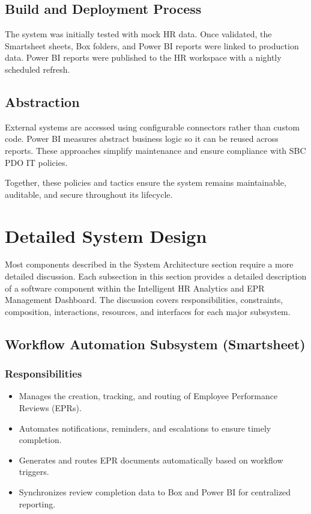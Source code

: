 \documentclass[12pt]{article}
\def\textit#1{#1}%
\def\&{ and }%
\begin{document}
\subsection{Build and Deployment Process}
The system was initially tested with mock HR data. Once validated, the Smartsheet sheets, Box folders, and Power BI reports were linked to production data. Power BI
reports were published to the HR workspace with a nightly scheduled refresh.

\subsection{Abstraction}
External systems are accessed using configurable connectors rather than custom code. Power BI
measures abstract business logic so it can be reused across reports. These approaches simplify
maintenance and ensure compliance with SBC PDO IT policies.

\noindent\textit{Together, these policies and tactics ensure the system remains maintainable,
auditable, and secure throughout its lifecycle.}

\section{Detailed System Design}

Most components described in the System Architecture section require a more detailed discussion.  
Each subsection in this section provides a detailed description of a software component within the Intelligent HR Analytics \& EPR Management Dashboard.  
The discussion covers responsibilities, constraints, composition, interactions, resources, and interfaces for each major subsystem.

\subsection{Workflow Automation Subsystem (Smartsheet)}

\subsubsection{Responsibilities}
\begin{itemize}[nosep]
  \item Manages the creation, tracking, and routing of Employee Performance Reviews (EPRs).
  \item Automates notifications, reminders, and escalations to ensure timely completion.
  \item Generates and routes EPR documents automatically based on workflow triggers.
  \item Synchronizes review completion data to Box and Power BI for centralized reporting.
\end{itemize}
\end{document}
